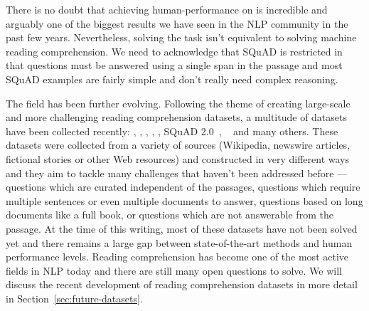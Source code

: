 
There is no doubt that achieving human-performance on  is incredible and arguably one of the biggest results we have seen in the NLP community in the past few years. Nevertheless, solving the  task isn't equivalent to solving machine reading comprehension. We need to acknowledge that SQuAD is restricted in that questions must be answered using a single span in the passage and most SQuAD examples are fairly simple and don't really need complex reasoning.

The field has been further evolving. Following the theme of creating large-scale and more challenging reading comprehension datasets, a multitude of datasets have been collected recently:  \cite{joshi2017triviaqa},  \cite{lai2017race},  \cite{welbl2018constructing},  \cite{kovcisky2018narrativeqa},  \cite{khashabi2018looking}, SQuAD 2.0~\cite{rajpurkar2018know}, ~\cite{yang2018hotpotqa} and many others. These datasets were collected from a variety of sources (Wikipedia, newswire articles, fictional stories or other Web resources) and constructed in very different ways and they aim to tackle many challenges that haven't been addressed before --- questions which are curated independent of the passages, questions which require multiple sentences or even multiple documents to answer, questions based on long documents like a full book, or questions which are not answerable from the passage. At the time of this writing, most of these datasets have not been solved yet and there remains a large gap between state-of-the-art methods and human performance levels. Reading comprehension has become one of the most active fields in NLP today and there are still many open questions to solve. We will discuss the recent development of reading comprehension datasets in more detail in Section~\ref{sec:future-datasets}.
